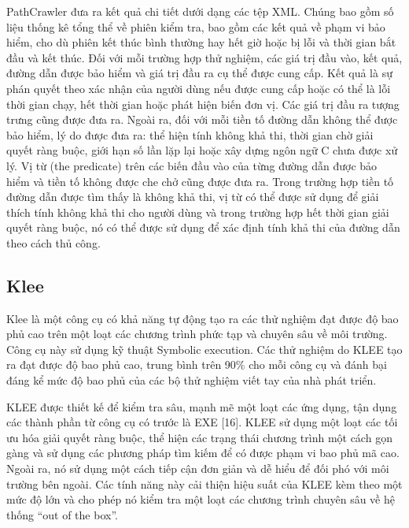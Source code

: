 \documentclass[12pt,a4paper]{article}
\begin{document}
\indent PathCrawler đưa ra kết quả chi tiết dưới dạng các tệp XML. Chúng bao gồm số liệu thống kê tổng thể về phiên kiểm tra, bao gồm các kết quả về phạm vi bảo hiểm, cho dù phiên kết thúc bình thường hay hết giờ hoặc bị lỗi và thời gian bắt đầu và kết thúc. Đối với mỗi trường hợp thử nghiệm, các giá trị đầu vào, kết quả, đường dẫn được bảo hiểm và giá trị đầu ra cụ thể được cung cấp. Kết quả là sự phán quyết theo xác nhận của người dùng nếu được cung cấp hoặc có thể là lỗi thời gian chạy, hết thời gian hoặc phát hiện biến đơn vị. Các giá trị đầu ra tượng trưng cũng được đưa ra. Ngoài ra, đối với mỗi tiền tố đường dẫn không thể được bảo hiểm, lý do được đưa ra: thể hiện tính không khả thi, thời gian chờ giải quyết ràng buộc, giới hạn số lần lặp lại hoặc xây dựng ngôn ngữ C chưa được xử lý. Vị từ (the predicate) trên các biến đầu vào của từng đường dẫn được bảo hiểm và tiền tố không được che chở cũng được đưa ra. Trong trường hợp tiền tố đường dẫn được tìm thấy là không khả thi, vị từ có thể được sử dụng để giải thích tính không khả thi cho người dùng và trong trường hợp hết thời gian giải quyết ràng buộc, nó có thể được sử dụng để xác định tính khả thi của đường dẫn theo cách thủ công.
\subsection{Klee}
Klee là một công cụ có khả năng tự động tạo ra các thử nghiệm đạt được độ bao phủ cao trên một loạt các chương trình phức tạp và chuyên sâu về môi trường. Công cụ này sử dụng kỹ thuật Symbolic execution. Các thử nghiệm do KLEE tạo ra đạt được độ bao phủ cao, trung bình trên 90\% cho mỗi công cụ và đánh bại đáng kể mức độ bao phủ của các bộ thử nghiệm viết tay của nhà phát triển.

\indent KLEE được thiết kế để kiểm tra sâu, mạnh mẽ một loạt các ứng dụng, tận dụng các thành phần từ công cụ có trước là EXE [16]. KLEE sử dụng một loạt các tối ưu hóa giải quyết ràng buộc, thể hiện các trạng thái chương trình một cách gọn gàng và sử dụng các phương pháp tìm kiếm để có được phạm vi bao phủ mã cao. Ngoài ra, nó sử dụng một cách tiếp cận đơn giản và dễ hiểu để đối phó với môi trường bên ngoài. Các tính năng này cải thiện hiệu suất của KLEE kèm theo một mức độ lớn và cho phép nó kiểm tra một loạt các chương trình chuyên sâu về hệ thống “out of the box”.
\end{document}
